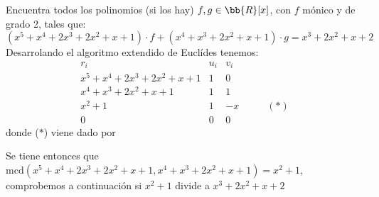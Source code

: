 \documentclass[12pt]{article}
\begin{document}
    \begin{ejercicio} [1,25 puntos]
        Encuentra todos los polinomios (si los hay) $f,g\in\bb{R}[x]$, con $f$ mónico y de grado 2, tales que:
        \begin{equation*}
            (x^5+x^4+2x^3+2x^2+x+1)\cdot f+(x^4+x^3+2x^2+x+1)\cdot g=x^3+2x^2+x+2
        \end{equation*}
        Desarrolando el algoritmo extendido de Euclídes tenemos:
        \begin{equation*}
            \begin{array}{c|c|cl}
                r_i & u_i & v_i & \\ \hline
                x^5+x^4+2x^3+2x^2+x+1 & 1 & 0  &\\
                x^4+x^3+2x^2+x+1 & 1 & 1 & \\
                x^2+1 & 1 & -x & \quad  \quad(\ast) \\
                0 & 0 & 0
            \end{array}
        \end{equation*}
        donde ($\ast$) viene dado por 
        \begin{center}
        \end{center}
        Se tiene entonces que $\text{mcd}(x^5+x^4+2x^3+2x^2+x+1,x^4+x^3+2x^2+x+1)=x^2+1$, comprobemos a continuación
        si $x^2+1$ divide a $x^3+2x^2+x+2$
        \begin{center}
\end{center}
\end{ejercicio}
\end{document}
